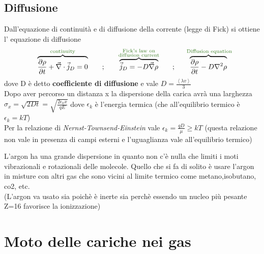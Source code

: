 \subsection{Diffusione}
Dall'equazione di continuità e di diffusione della corrente (legge di Fick) si ottiene l' equazione di diffusione
\[ \mathexplain[cu]{\frac{\partial \rho }{\partial t} +\vec{\nabla} \cdot \vec{j} _{D} =0}{\text{continuity}} \quad \quad ; \quad \quad \mathexplain[cu]{\vec{j} _{D}=-D \vec{\nabla} \rho  }{\text{Fick's law on} \\ \text{diffusion current} } \quad \quad ; \quad \quad \mathexplain[cu]{\frac{\partial \rho }{\partial t} -D \nabla^2  \rho }{\text{ Diffusion equation}} 
 \]
 dove D è detto \textbf{coefficiente di diffusione } e vale $D=\frac{\left<\lambda v\right>}{3}$
\\ 
 Dopo aver percorso un distanza x la dispersione della carica avrà una larghezza $\sigma_x=\sqrt{2Dt}=\sqrt{\frac{2\epsilon_kx}{qE}}$ dove $\epsilon_k$ è l'energia termica (che all'equilibrio termico è $\epsilon_k=kT$)
 \\ 
 Per la relazione di \textit{Nernst-Townsend-Einstein} vale $\epsilon_k=\frac{qD}{\mu} \geq kT$ (questa relazione non vale in presenza di campi esterni e l'uguaglianza vale all'equilibrio termico)
\begin{note}
    L'argon ha una grande dispersione in quanto non c'è nulla che limiti i moti vibrazionali e rotazionali delle molecole. Quello che si fa di solito è usare l'argon in misture con altri gas che sono vicini al limite termico come metano,isobutano, co2, etc.
\\ 
    (L'argon va usato sia poichè è inerte sia perchè essendo un nucleo più pesante Z=16 favorisce la ionizzazione)
\end{note}
\newpage

\section{Moto delle cariche nei gas}
